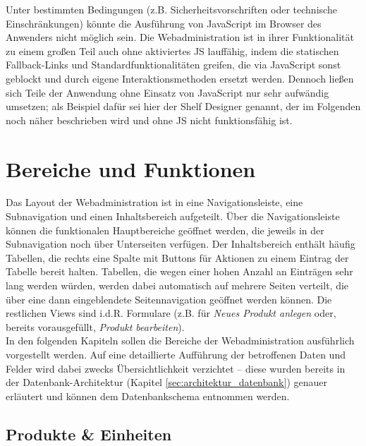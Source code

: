 Unter bestimmten Bedingungen (z.B. Sicherheitsvorschriften oder technische Einschränkungen) könnte die Ausführung von JavaScript im Browser des Anwenders nicht möglich sein. Die Webadministration ist in ihrer Funktionalität zu einem großen Teil auch ohne aktiviertes \acs{JS} lauffähig, indem die statischen Fallback-Links und Standardfunktionalitäten greifen, die via JavaScript sonst geblockt und durch eigene Interaktionsmethoden ersetzt werden. Dennoch ließen sich Teile der Anwendung ohne Einsatz von JavaScript nur sehr aufwändig umsetzen; als Beispiel dafür sei hier der Shelf Designer genannt, der im Folgenden noch näher beschrieben wird und ohne \acs{JS} nicht funktionsfähig ist.\


\section{Bereiche und Funktionen}

Das Layout der Webadministration ist in eine Navigationsleiste, eine Subnavigation und einen Inhaltsbereich aufgeteilt. Über die Navigationsleiste können die funktionalen Hauptbereiche geöffnet werden, die jeweils in der Subnavigation noch über Unterseiten verfügen. Der Inhaltsbereich enthält häufig Tabellen, die rechts eine Spalte mit Buttons für Aktionen zu einem Eintrag der Tabelle bereit halten. Tabellen, die wegen einer hohen Anzahl an Einträgen sehr lang werden würden, werden dabei automatisch auf mehrere Seiten verteilt, die über eine dann eingeblendete Seitennavigation geöffnet werden können. Die restlichen Views sind i.d.R. Formulare (z.B. für \emph{Neues Produkt anlegen} oder, bereits vorausgefüllt, \emph{Produkt bearbeiten}).\\

In den folgenden Kapiteln sollen die Bereiche der Webadministration ausführlich vorgestellt werden. Auf eine detaillierte Aufführung der betroffenen Daten und Felder wird dabei zwecks Übersichtlichkeit verzichtet -- diese wurden bereits in der Datenbank-Architektur (Kapitel \ref{sec:architektur_datenbank}) genauer erläutert und können dem Datenbankschema entnommen werden.


\subsection{Produkte \& Einheiten}

